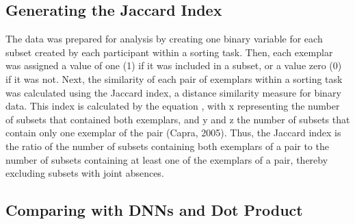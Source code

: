 \documentclass[11pt, twoside]{article}
\begin{document}
\subsection*{Generating the Jaccard Index}
The data was prepared for analysis by creating one binary variable for each subset created by each participant within a sorting task. Then, each exemplar was assigned a value of one (1) if it was included in a subset, or a value zero (0) if it was not. Next, the similarity of each pair of exemplars within a sorting task was calculated using the Jaccard index, a distance similarity measure for binary data. This index is calculated by the equation  , with x representing the number of subsets that contained both 
exemplars, and y and z the number of subsets that contain only one exemplar of the pair (Capra, 2005). Thus, the Jaccard index is the ratio of the number of subsets containing both exemplars of a pair to the number of subsets containing at least one of the exemplars of a pair, thereby excluding subsets with joint absences.  

\subsection*{Comparing with DNNs and Dot Product}


\begin{multicols}{2}
\small
 

\end{multicols}
\end{document}
